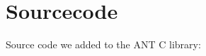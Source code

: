 \chapter{Sourcecode}


\newpage

\newpage

\newpage
Source code we added to the ANT C library\cite{ANTPICLIB}:


